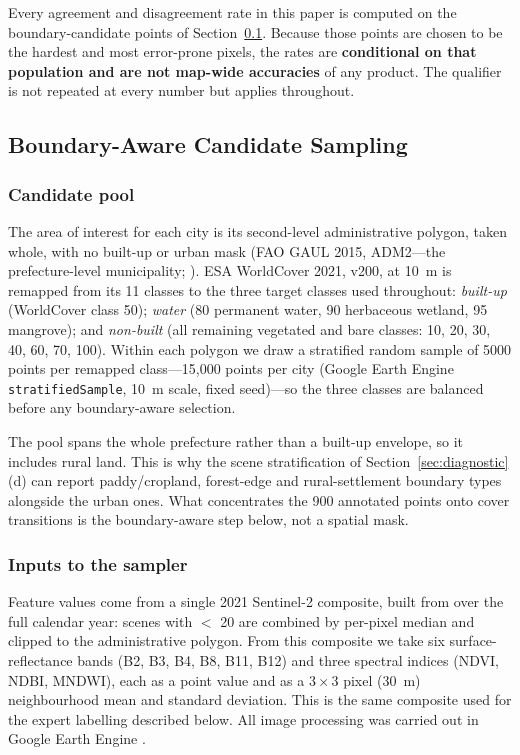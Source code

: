 \documentclass[remotesensing,article,submit,moreauthors]{Definitions/mdpi}
\begin{document}
Every agreement and disagreement rate in this paper is computed on the
boundary-candidate points of Section~\ref{sec:sampling}. Because those points
are chosen to be the hardest and most error-prone pixels, the rates are
\textbf{conditional on that population and are not map-wide accuracies} of any
product. The qualifier is not repeated at every number but applies throughout.

\subsection{Boundary-Aware Candidate Sampling}\label{sec:sampling}

\subsubsection*{Candidate pool}

The area of interest for each city is its second-level administrative polygon,
taken whole, with no built-up or urban mask (FAO GAUL 2015, ADM2---the
prefecture-level municipality; \cite{fao2015gaul}). ESA WorldCover 2021,
v200, at 10~m \citep{zanaga2022} is remapped from its 11 classes to the three
target classes used throughout: \emph{built-up} (WorldCover class 50);
\emph{water} (80 permanent water, 90 herbaceous wetland, 95 mangrove); and
\emph{non-built} (all remaining vegetated and bare classes: 10, 20, 30, 40, 60,
70, 100). Within each polygon we draw a stratified random sample of 5000 points
per remapped class---15,000 points per city (Google Earth Engine
\texttt{stratifiedSample}, 10~m scale, fixed seed)---so the three classes are
balanced before any boundary-aware selection.

The pool spans the whole prefecture rather than a built-up envelope, so it
includes rural land. This is why the scene stratification of
Section~\ref{sec:diagnostic}(d) can report paddy/cropland, forest-edge and
rural-settlement boundary types alongside the urban ones. What concentrates the
900 annotated points onto cover transitions is the boundary-aware step below,
not a spatial mask.

\subsubsection*{Inputs to the sampler}

Feature values come from a single 2021 Sentinel-2 composite, built from
\href{https://developers.google.com/earth-engine/datasets/catalog/COPERNICUS_S2_SR_HARMONIZED}{} over the full calendar year: scenes with
 $<$ 20 are combined by per-pixel median and
clipped to the administrative polygon. From this composite we take six
surface-reflectance bands (B2, B3, B4, B8, B11, B12) and three spectral indices
(NDVI, NDBI, MNDWI), each as a point value and as a $3 \times 3$ pixel (30~m)
neighbourhood mean and standard deviation. This is the same composite used for
the expert labelling described below. All image processing was carried out in
Google Earth Engine \citep{gorelick2017}.
\end{document}
